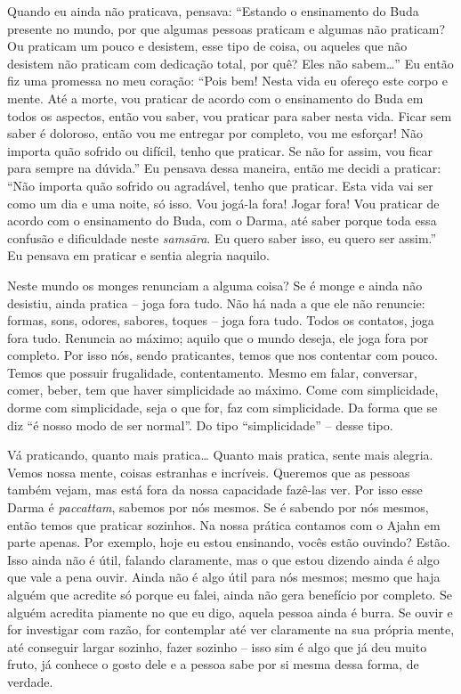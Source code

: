 Quando eu ainda não praticava, pensava: “Estando o ensinamento do
Buda presente no mundo, por que algumas pessoas praticam e algumas não
praticam? Ou praticam um pouco e desistem, esse tipo de coisa, ou
aqueles que não desistem não praticam com dedicação total, por quê?
Eles não sabem…” Eu então fiz uma promessa no meu coração: “Pois bem!
Nesta vida eu ofereço este corpo e mente. Até a morte, vou praticar de
acordo com o ensinamento do Buda em todos os aspectos, então vou saber,
vou praticar para saber nesta vida. Ficar sem saber é doloroso, então
vou me entregar por completo, vou me esforçar! Não importa quão sofrido
ou difícil, tenho que praticar. Se não for assim, vou ficar para sempre
na dúvida.” Eu pensava dessa maneira, então me decidi a praticar: “Não
importa quão sofrido ou agradável, tenho que praticar. Esta vida vai
ser como um dia e uma noite, só isso. Vou jogá-la fora! Jogar fora! Vou
praticar de acordo com o ensinamento do Buda, com o Darma, até saber
porque toda essa confusão e dificuldade neste \textit{samsāra}. Eu
quero saber isso, eu quero ser assim.” Eu pensava em praticar e sentia
alegria naquilo. 

Neste mundo os monges renunciam a alguma coisa? Se é monge e ainda
não desistiu, ainda pratica – joga fora tudo. Não há nada a que ele não
renuncie: formas, sons, odores, sabores, toques – joga fora tudo. Todos
os contatos, joga fora tudo. Renuncia ao máximo; aquilo que o mundo
deseja, ele joga fora por completo. Por isso nós, sendo praticantes,
temos que nos contentar com pouco. Temos que possuir frugalidade,
contentamento. Mesmo em falar, conversar, comer, beber, tem que haver
simplicidade ao máximo. Come com simplicidade, dorme com simplicidade,
seja o que for, faz com simplicidade. Da forma que se diz “é nosso modo
de ser normal”. Do tipo “simplicidade” – desse tipo. 

Vá praticando, quanto mais pratica… Quanto mais pratica, sente mais
alegria. Vemos nossa mente, coisas estranhas e incríveis. Queremos que
as pessoas também vejam, mas está fora da nossa capacidade fazê-las
ver. Por isso esse Darma é \textit{paccattam}, sabemos por nós mesmos.
Se é sabendo por nós mesmos, então temos que praticar sozinhos. Na
nossa prática contamos com o Ajahn em parte apenas. Por exemplo, hoje
eu estou ensinando, vocês estão ouvindo? Estão. Isso ainda não é útil,
falando claramente, mas o que estou dizendo ainda é algo que vale a
pena ouvir. Ainda não é algo útil para nós mesmos; mesmo que haja
alguém que acredite só porque eu falei, ainda não gera benefício por
completo. Se alguém acredita piamente no que eu digo, aquela pessoa
ainda é burra. Se ouvir e for investigar com razão, for contemplar até
ver claramente na sua própria mente, até conseguir largar sozinho,
fazer sozinho – isso sim é algo que já deu muito fruto, já conhece o
gosto dele e a pessoa sabe por si mesma dessa forma, de verdade. 


